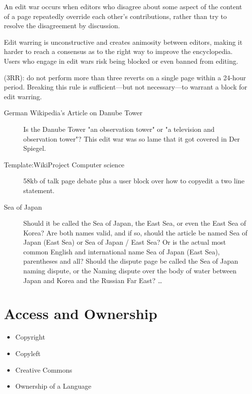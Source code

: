 \documentclass[a4paper,landscape,headrule,footrule,xetex]{foils}
\begin{document}
\MyLogo{}
An edit war occurs when editors who disagree about some aspect of the
content of a page repeatedly override each other's contributions,
rather than try to resolve the disagreement by discussion.

Edit warring is unconstructive and creates animosity between editors,
making it harder to reach a consensus as to the right way to improve
the encyclopedia. Users who engage in edit wars risk being blocked or
even banned from editing.

 (3RR): do not perform more than three reverts on a
single page within a 24-hour period. Breaking this rule is
sufficient—but not necessary—to warrant a block for edit warring.




\begin{description}
\item [German Wikipedia's Article on Danube Tower]
Is the Danube Tower "an observation tower" or "a television and observation tower"? This edit war was so lame that it got covered in Der Spiegel.
\item [Template:WikiProject Computer science]
58kb of talk page debate plus a user block over how to copyedit a two line statement.
\item [Sea of Japan]
Should it be called the Sea of Japan, the East Sea, or even the East Sea of Korea? Are both names valid, and if so, should the article be named Sea of Japan (East Sea) or Sea of Japan / East Sea? Or is the actual most common English and international name Sea of Japan (East Sea), parentheses and all? Should the dispute page be called the Sea of Japan naming dispute, or the Naming dispute over the body of water between Japan and Korea and the Russian Far East? \ldots
\end{description}

\section{Access and Ownership}
\MyLogo{}


\begin{itemize}
\item Copyright
\item Copyleft
\item Creative Commons
\item Ownership of a Language
\end{itemize}
\end{document}
